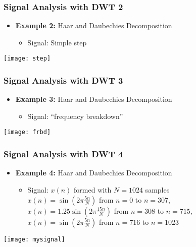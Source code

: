 \documentclass[9pt]{beamer}
\begin{document}
\begin{frame}
\frametitle{Signal Analysis with DWT \hfill{2}}


\begin{itemize} 
\item \textbf{Example 2:} Haar and Daubechies Decomposition
    \begin{itemize} 
    \item Signal: Simple step
    \end{itemize}
\end{itemize}
\begin{center}
\texttt{[image: step]}
\end{center}
\end{frame}

\begin{frame}
\frametitle{Signal Analysis with DWT \hfill{3}}

\begin{itemize} 
\item \textbf{Example 3:} Haar and Daubechies Decomposition
    \begin{itemize} 
    \item Signal: ``frequency breakdown'' 
    \end{itemize}
\end{itemize}
\begin{center}
\texttt{[image: frbd]}
\end{center}

\end{frame}

\begin{frame}
\frametitle{Signal Analysis with DWT \hfill{4}}

\begin{itemize} 
\item \textbf{Example 4:} Haar and Daubechies Decomposition
    \begin{itemize} 
    \item Signal: $x(n)$ formed with $N=1024$ samples \\
    $x(n)=\sin(2\pi\frac{5n}{N})$ from $n=0$ to $n=307$, \\
    $x(n)=1.25\sin(2\pi\frac{15n}{N})$ from $n=308$ to $n=715$, \\
    $x(n)=\sin(2\pi\frac{5n}{N})$ from $n=716$ to $n=1023$ 
    \end{itemize}
\end{itemize}

\begin{center}
\texttt{[image: mysignal]}
\end{center}
\end{frame}
\end{document}
